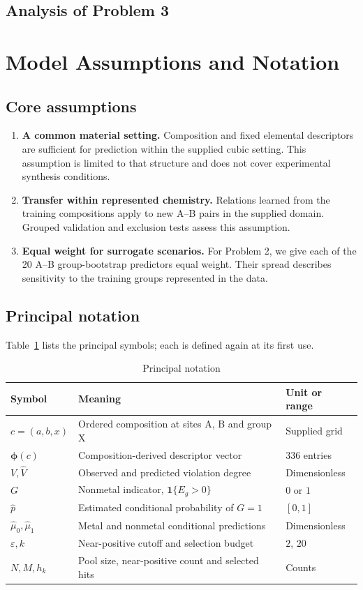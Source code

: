 \subsection{Analysis of Problem 3}

\section{Model Assumptions and Notation}
\subsection{Core assumptions}
\begin{enumerate}
  \item \textbf{A common material setting.} Composition and fixed elemental descriptors are sufficient for prediction within the supplied cubic setting. This assumption is limited to that structure and does not cover experimental synthesis conditions.
  \item \textbf{Transfer within represented chemistry.} Relations learned from the training compositions apply to new A--B pairs in the supplied domain. Grouped validation and exclusion tests assess this assumption.
  \item \textbf{Equal weight for surrogate scenarios.} For Problem 2, we give each of the 20 A--B group-bootstrap predictors equal weight. Their spread describes sensitivity to the training groups represented in the data.
\end{enumerate}

\subsection{Principal notation}
Table~\ref{tab:notation} lists the principal symbols; each is defined again at its first use.
\par
\begin{table}[H]
\centering
\caption{Principal notation}\label{tab:notation}
\begin{tabularx}{\linewidth}{@{}l X l@{}}
\toprule
Symbol & Meaning & Unit or range\\
\midrule
$c=(a,b,x)$ & Ordered composition at sites A, B and group X & Supplied grid\\
$\boldsymbol\phi(c)$ & Composition-derived descriptor vector & 336 entries\\
$V,\widehat V$ & Observed and predicted violation degree & Dimensionless\\
$G$ & Nonmetal indicator, $\mathbf{1}\{E_g>0\}$ & $0$ or $1$\\
$\widehat p$ & Estimated conditional probability of $G=1$ & $[0,1]$\\
$\widehat\mu_0,\widehat\mu_1$ & Metal and nonmetal conditional predictions & Dimensionless\\
$\varepsilon,k$ & Near-positive cutoff and selection budget & $2$, $20$\\
$N,M,h_k$ & Pool size, near-positive count and selected hits & Counts\\
\bottomrule
\end{tabularx}
\end{table}
\par
\FloatBarrier
